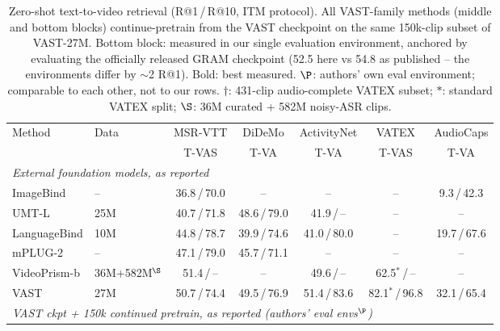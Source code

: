 \begin{table}[t]
\centering
\caption{Zero-shot text-to-video retrieval (R@1\,/\,R@10, ITM protocol). All
VAST-family methods (middle and bottom blocks) continue-pretrain from the VAST
checkpoint on the same 150k-clip subset of VAST-27M. Bottom block: measured in our
single evaluation environment, anchored by evaluating the officially released GRAM
checkpoint (52.5 here vs 54.8 as published -- the environments differ by
$\sim$2 R@1). Bold: best measured. $\P$: authors' own eval environment; comparable
to each other, not to our rows. $\dagger$: 431-clip audio-complete VATEX subset;
$*$: standard VATEX split; $\S$: 36M curated + 582M noisy-ASR clips.}
\label{tab:main_single}
\small
\begin{tabular}{llccccc}
\toprule
Method & Data & MSR-VTT & DiDeMo & ActivityNet & VATEX & AudioCaps \\
 & & T-VAS & T-VA & T-VA & T-VAS & T-VA \\
\midrule
\multicolumn{7}{l}{\emph{External foundation models, as reported}} \\
ImageBind & -- & 36.8\,/\,70.0 & -- & -- & -- & 9.3\,/\,42.3 \\
UMT-L & 25M & 40.7\,/\,71.8 & 48.6\,/\,79.0 & 41.9\,/\,-- & -- & -- \\
LanguageBind & 10M & 44.8\,/\,78.7 & 39.9\,/\,74.6 & 41.0\,/\,80.0 & -- & 19.7\,/\,67.6 \\
mPLUG-2 & -- & 47.1\,/\,79.0 & 45.7\,/\,71.1 & -- & -- & -- \\
VideoPrism-b & 36M+582M$^{\S}$ & 51.4\,/\,-- & -- & 49.6\,/\,-- & 62.5$^{*}$\,/\,-- & -- \\
VAST & 27M & 50.7\,/\,74.4 & 49.5\,/\,76.9 & 51.4\,/\,83.6 & 82.1$^{*}$\,/\,96.8 & 32.1\,/\,65.4 \\
\midrule
\multicolumn{7}{l}{\emph{VAST ckpt + 150k continued pretrain, as reported (authors' eval envs$^{\P}$)}} \\

\end{tabular}
\end{table}
